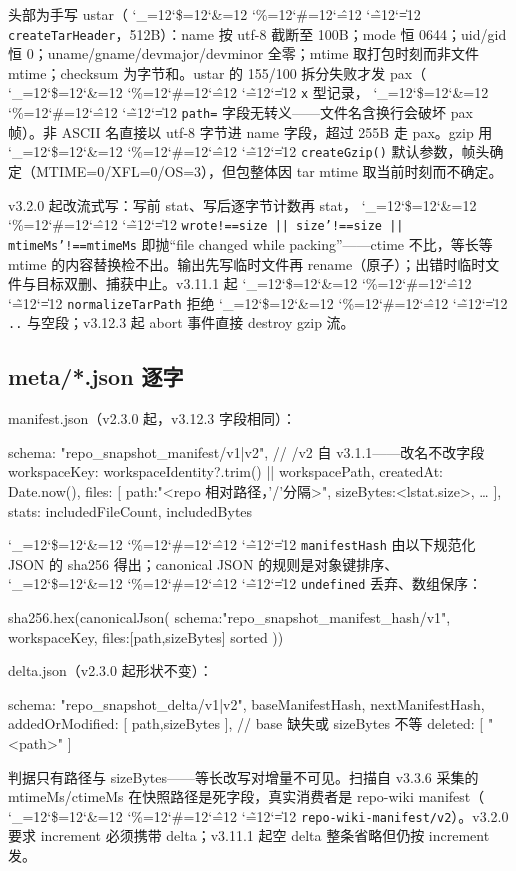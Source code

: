 \documentclass[11pt,a4paper,fontset=none]{ctexart}
\newcommand{\cid}{%
  \begingroup
  \catcode`\_=12\relax \catcode`\$=12\relax \catcode`\&=12\relax
  \catcode`\%=12\relax \catcode`\#=12\relax \catcode`\^=12\relax
  \catcode`\~=12\relax \catcode`\|=12\relax
  \codeSpan}
\newcommand{\codeSpan}[1]{{\small\texttt{#1}}\endgroup}
\begin{document}
头部为手写 ustar（\cid{createTarHeader}，512B）：name 按 utf-8 截断至 100B；mode 恒 0644；uid/gid 恒 0；uname/gname/devmajor/devminor 全零；mtime 取打包时刻而非文件 mtime；checksum 为字节和。ustar 的 155/100 拆分失败才发 pax（\cid{x} 型记录，\cid{path=} 字段无转义——文件名含换行会破坏 pax 帧）。非 ASCII 名直接以 utf-8 字节进 name 字段，超过 255B 走 pax。gzip 用 \cid{createGzip()} 默认参数，帧头确定（MTIME=0/XFL=0/OS=3），但包整体因 tar mtime 取当前时刻而不确定。

v3.2.0 起改流式写：写前 stat、写后逐字节计数再 stat，\cid{wrote!==size || size'!==size || mtimeMs'!==mtimeMs} 即抛“file changed while packing”——ctime 不比，等长等 mtime 的内容替换检不出。输出先写临时文件再 rename（原子）；出错时临时文件与目标双删、捕获中止。v3.11.1 起 \cid{normalizeTarPath} 拒绝 \cid{..} 与空段；v3.12.3 起 abort 事件直接 destroy gzip 流。

\subsection{meta/*.json 逐字}

manifest.json（v2.3.0 起，v3.12.3 字段相同）：

\begin{code}
{ schema: "repo_snapshot_manifest/v1|v2",        // /v2 自 v3.1.1——改名不改字段
  workspaceKey: workspaceIdentity?.trim() || workspacePath,
  createdAt: Date.now(),
  files: [ {path:"<repo 相对路径，'/'分隔>", sizeBytes:<lstat.size>}, … ],
  stats: { includedFileCount, includedBytes } }
\end{code}

\cid{manifestHash} 由以下规范化 JSON 的 sha256 得出；canonical JSON 的规则是对象键排序、\cid{undefined} 丢弃、数组保序：

\begin{code}
sha256.hex(canonicalJson({
    schema:"repo_snapshot_manifest_hash/v1",
    workspaceKey, files:[{path,sizeBytes}] sorted }))
\end{code}

delta.json（v2.3.0 起形状不变）：

\begin{code}
{ schema: "repo_snapshot_delta/v1|v2",
  baseManifestHash, nextManifestHash,
  addedOrModified: [ {path,sizeBytes} ],   // base 缺失或 sizeBytes 不等
  deleted: [ "<path>" ] }
\end{code}

判据只有路径与 sizeBytes——等长改写对增量不可见。扫描自 v3.3.6 采集的 mtimeMs/ctimeMs 在快照路径是死字段，真实消费者是 repo-wiki manifest（\cid{repo-wiki-manifest/v2}）。v3.2.0 要求 increment 必须携带 delta；v3.11.1 起空 delta 整条省略但仍按 increment 发。
\end{document}
